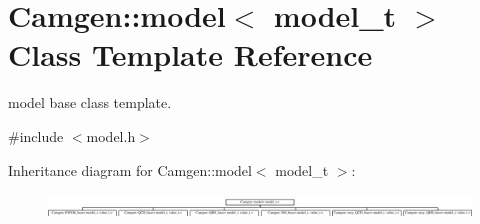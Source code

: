 \hypertarget{a00372}{}\section{Camgen\+:\+:model$<$ model\+\_\+t $>$ Class Template Reference}
\label{a00372}


model base class template.  




{\ttfamily \#include $<$model.\+h$>$}

Inheritance diagram for Camgen\+:\+:model$<$ model\+\_\+t $>$\+:\begin{figure}[H]
\begin{center}
\leavevmode
\includegraphics[height=0.657277cm]{a00372}
\end{center}
\end{figure}
